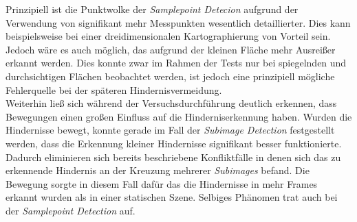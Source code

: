 \noindent
Prinzipiell ist die Punktwolke der \emph{Samplepoint Detecion} aufgrund der Verwendung von signifikant mehr Messpunkten wesentlich detaillierter. Dies kann beispielsweise bei einer dreidimensionalen Kartographierung von Vorteil sein. Jedoch wäre es auch möglich, das aufgrund der kleinen Fläche mehr Ausreißer  erkannt werden. Dies konnte zwar im Rahmen der Tests nur bei spiegelnden und durchsichtigen Flächen beobachtet werden, ist jedoch eine prinzipiell mögliche Fehlerquelle bei der späteren Hindernisvermeidung.\\

\noindent
Weiterhin ließ sich während der Versuchsdurchführung deutlich erkennen, dass Bewegungen einen großen Einfluss auf die Hinderniserkennung haben. Wurden die Hindernisse bewegt, konnte gerade im Fall der \textit{Subimage Detection} festgestellt werden, dass die Erkennung kleiner Hindernisse signifikant besser funktionierte. Dadurch eliminieren sich bereits beschriebene Konfliktfälle in denen sich das zu erkennende Hindernis an der Kreuzung mehrerer \textit{Subimages} befand. Die Bewegung sorgte in diesem Fall dafür das die Hindernisse in mehr Frames erkannt wurden als in einer statischen Szene. Selbiges Phänomen trat auch bei der \textit{Samplepoint Detection} auf.\\


